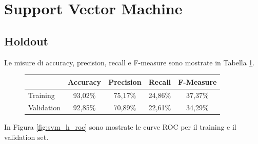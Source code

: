 \section{Support Vector Machine}

\subsection{Holdout}
Le misure di accuracy, precision, recall e F-measure sono mostrate in 
Tabella \ref{tab:svm_h_performance}.

\begin{figure}[H]
	\centering
	\begin{tabular}{lcccc}
		\toprule
		& \textbf{Accuracy} & \textbf{Precision} & \textbf{Recall} & 
		\textbf{F-Measure}  \\
		\midrule
		Training	& 93,02\% & 75,17\% & 24,86\% & 37,37\%    	\\ 
		Validation	& 92,85\% & 70,89\% & 22,61\% & 34,29\%   	\\ 
		\bottomrule
	\end{tabular}
	\label{tab:svm_h_performance}
\end{figure}

In Figura \ref{fig:svm_h_roc} sono mostrate le curve ROC per il training e il validation 
set.

